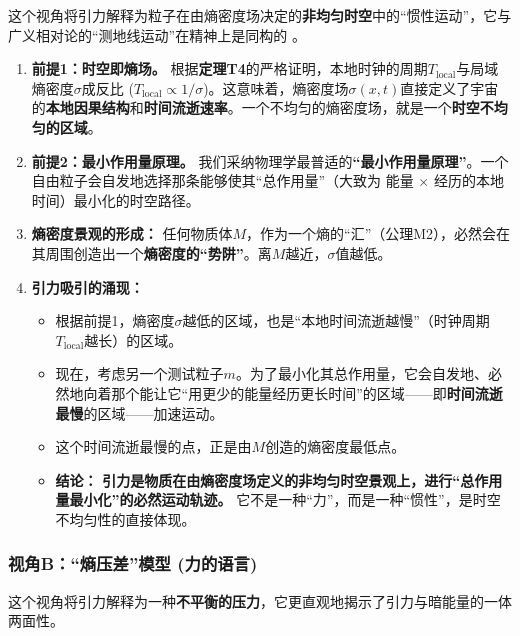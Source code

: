 \documentclass[11pt, a4paper]{article}
\begin{document}
这个视角将引力解释为粒子在由熵密度场决定的\textbf{非均匀时空}中的“惯性运动”，它与广义相对论的“测地线运动”在精神上是同构的 \cite{Einstein1905}。

\begin{enumerate}
    \item \textbf{前提1：时空即熵场。} 根据\textbf{定理T4}的严格证明，本地时钟的周期$T_{\text{local}}$与局域熵密度$\sigma$成反比 ($T_{\text{local}} \propto 1/\sigma$)。这意味着，熵密度场$\sigma(x,t)$直接定义了宇宙的\textbf{本地因果结构}和\textbf{时间流逝速率}。一个不均匀的熵密度场，就是一个\textbf{时空不均匀的区域}。

    \item \textbf{前提2：最小作用量原理。} 我们采纳物理学最普适的\textbf{“最小作用量原理”}。一个自由粒子会自发地选择那条能够使其“总作用量”（大致为 能量 $\times$ 经历的本地时间）最小化的时空路径。

    \item \textbf{熵密度景观的形成：} 任何物质体$M$，作为一个熵的“汇”（公理M2），必然会在其周围创造出一个\textbf{熵密度的“势阱”}。离$M$越近，$\sigma$值越低。

    \item \textbf{引力吸引的涌现：}
    \begin{itemize}
        \item 根据前提1，熵密度$\sigma$越低的区域，也是“本地时间流逝越慢”（时钟周期$T_{\text{local}}$越长）的区域。
        \item 现在，考虑另一个测试粒子$m$。为了最小化其总作用量，它会自发地、必然地向着那个能让它“用更少的能量经历更长时间”的区域——即\textbf{时间流逝最慢}的区域——加速运动。
        \item 这个时间流逝最慢的点，正是由$M$创造的熵密度最低点。
        \item \textbf{结论：} \textbf{引力是物质在由熵密度场定义的非均匀时空景观上，进行“总作用量最小化”的必然运动轨迹。} 它不是一种“力”，而是一种“惯性”，是时空不均匀性的直接体现。
    \end{itemize}
\end{enumerate}

\subsubsection*{视角B：“熵压差”模型 (力的语言)}

这个视角将引力解释为一种\textbf{不平衡的压力}，它更直观地揭示了引力与暗能量的一体两面性。
\end{document}
